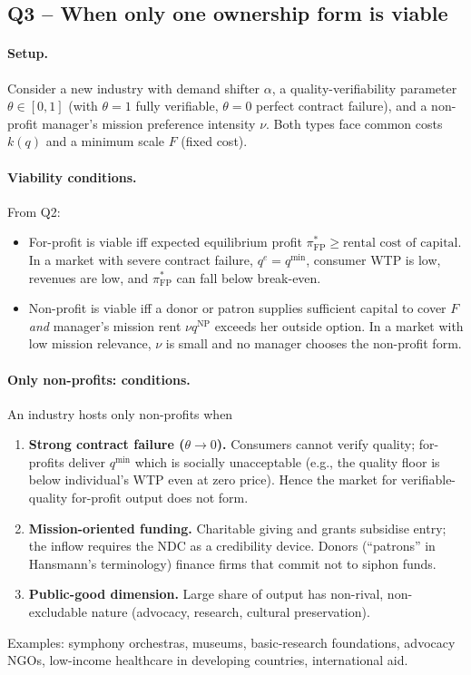 \documentclass[11pt,a4paper]{article}
\begin{document}
\subsection*{Q3 -- When only one ownership form is viable}

\paragraph{Setup.}
Consider a new industry with demand shifter $\alpha$, a quality-verifiability parameter $\theta\in[0,1]$ (with $\theta=1$ fully verifiable, $\theta=0$ perfect contract failure), and a non-profit manager's mission preference intensity $\nu$. Both types face common costs $k(q)$ and a minimum scale $F$ (fixed cost).

\paragraph{Viability conditions.}
From Q2:
\begin{itemize}[leftmargin=*,itemsep=1pt]
    \item For-profit is viable iff expected equilibrium profit $\pi_{\mathrm{FP}}^{*}\ge\text{rental cost of capital}$. In a market with severe contract failure, $q^{e}=q^{\min}$, consumer WTP is low, revenues are low, and $\pi_{\mathrm{FP}}^{*}$ can fall below break-even.
    \item Non-profit is viable iff a donor or patron supplies sufficient capital to cover $F$ \emph{and} manager's mission rent $\nu q^{\mathrm{NP}}$ exceeds her outside option. In a market with low mission relevance, $\nu$ is small and no manager chooses the non-profit form.
\end{itemize}

\paragraph{Only non-profits: conditions.}
An industry hosts only non-profits when
\begin{enumerate}[leftmargin=*,itemsep=1pt]
    \item \textbf{Strong contract failure ($\theta\to 0$).} Consumers cannot verify quality; for-profits deliver $q^{\min}$ which is socially unacceptable (e.g., the quality floor is below individual's WTP even at zero price). Hence the market for verifiable-quality for-profit output does not form.
    \item \textbf{Mission-oriented funding.} Charitable giving and grants subsidise entry; the inflow requires the NDC as a credibility device. Donors (``patrons'' in Hansmann's terminology) finance firms that commit not to siphon funds.
    \item \textbf{Public-good dimension.} Large share of output has non-rival, non-excludable nature (advocacy, research, cultural preservation).
\end{enumerate}
Examples: symphony orchestras, museums, basic-research foundations, advocacy NGOs, low-income healthcare in developing countries, international aid.
\end{document}
